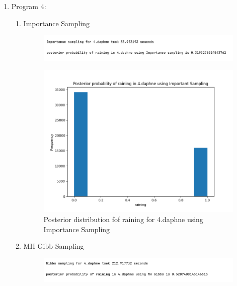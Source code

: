 \documentclass{article}
\begin{document}
\begin{enumerate}
\begin{enumerate}
\end{enumerate}

\item Program 4:
\begin{enumerate}
\item Importance Sampling

\begin{figure}[!ht]
	\centering
	\includegraphics[scale=0.6]{../figs/IS/4_program_results}
\end{figure}

\begin{figure}[!ht]
	\centering
	\includegraphics[scale=0.5]{../figs/IS/posterior_histogram_4_daphne}
	 \caption{Posterior distribution fof raining for 4.daphne using Importance Sampling}
\end{figure}

\newpage
\item MH Gibb Sampling

\begin{figure}[!ht]
	\centering
	\includegraphics[scale=0.5]{../figs/Gibbs/4_program_results}
\end{figure}


\end{enumerate}
\end{enumerate}
\end{document}
